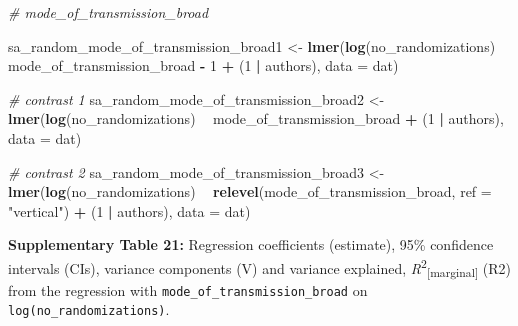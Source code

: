 \documentclass[
]{article}
\newenvironment{Shaded}{\begin{snugshade}}{\end{snugshade}}
\newcommand{\CommentTok}[1]{\textcolor[rgb]{0.56,0.35,0.01}{\textit{#1}}}
\newcommand{\DataTypeTok}[1]{\textcolor[rgb]{0.13,0.29,0.53}{#1}}
\newcommand{\DecValTok}[1]{\textcolor[rgb]{0.00,0.00,0.81}{#1}}
\newcommand{\KeywordTok}[1]{\textcolor[rgb]{0.13,0.29,0.53}{\textbf{#1}}}
\newcommand{\NormalTok}[1]{#1}
\newcommand{\OperatorTok}[1]{\textcolor[rgb]{0.81,0.36,0.00}{\textbf{#1}}}
\newcommand{\StringTok}[1]{\textcolor[rgb]{0.31,0.60,0.02}{#1}}
\begin{document}
\begin{Shaded}
\begin{Highlighting}[]
\CommentTok{# mode_of_transmission_broad}

\NormalTok{sa_random_mode_of_transmission_broad1 <-}\StringTok{ }\KeywordTok{lmer}\NormalTok{(}\KeywordTok{log}\NormalTok{(no_randomizations) }\OperatorTok{~}\StringTok{ }\NormalTok{mode_of_transmission_broad }\OperatorTok{-}\StringTok{ }
\StringTok{    }\DecValTok{1} \OperatorTok{+}\StringTok{ }\NormalTok{(}\DecValTok{1} \OperatorTok{|}\StringTok{ }\NormalTok{authors), }\DataTypeTok{data =}\NormalTok{ dat)}


\CommentTok{# contrast 1}
\NormalTok{sa_random_mode_of_transmission_broad2 <-}\StringTok{ }\KeywordTok{lmer}\NormalTok{(}\KeywordTok{log}\NormalTok{(no_randomizations) }\OperatorTok{~}\StringTok{ }\NormalTok{mode_of_transmission_broad }\OperatorTok{+}\StringTok{ }
\StringTok{    }\NormalTok{(}\DecValTok{1} \OperatorTok{|}\StringTok{ }\NormalTok{authors), }\DataTypeTok{data =}\NormalTok{ dat)}

\CommentTok{# contrast 2}
\NormalTok{sa_random_mode_of_transmission_broad3 <-}\StringTok{ }\KeywordTok{lmer}\NormalTok{(}\KeywordTok{log}\NormalTok{(no_randomizations) }\OperatorTok{~}\StringTok{ }\KeywordTok{relevel}\NormalTok{(mode_of_transmission_broad, }
    \DataTypeTok{ref =} \StringTok{"vertical"}\NormalTok{) }\OperatorTok{+}\StringTok{ }\NormalTok{(}\DecValTok{1} \OperatorTok{|}\StringTok{ }\NormalTok{authors), }\DataTypeTok{data =}\NormalTok{ dat)}
\end{Highlighting}
\end{Shaded}

\textbf{Supplementary Table 21:} Regression coefficients (estimate),
95\% confidence intervals (CIs), variance components (V) and variance
explained, \emph{R}\textsuperscript{2}\textsubscript{{[}marginal{]}}
(R2) from the regression with \texttt{mode\_of\_transmission\_broad} on
\texttt{log(no\_randomizations)}.
\end{document}
